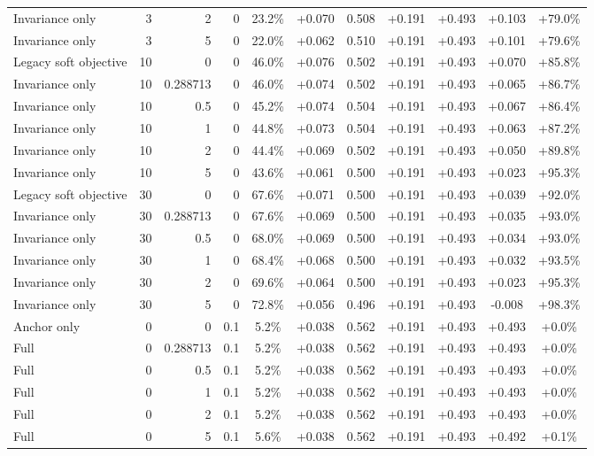 \begin{table}[htbp]
\begin{tabular}{lrrrccccccc}
Invariance only & 3 & 2 & 0 & 23.2\% & +0.070 & 0.508 & +0.191 & +0.493 & +0.103 & +79.0\% \\
Invariance only & 3 & 5 & 0 & 22.0\% & +0.062 & 0.510 & +0.191 & +0.493 & +0.101 & +79.6\% \\
Legacy soft objective & 10 & 0 & 0 & 46.0\% & +0.076 & 0.502 & +0.191 & +0.493 & +0.070 & +85.8\% \\
Invariance only & 10 & 0.288713 & 0 & 46.0\% & +0.074 & 0.502 & +0.191 & +0.493 & +0.065 & +86.7\% \\
Invariance only & 10 & 0.5 & 0 & 45.2\% & +0.074 & 0.504 & +0.191 & +0.493 & +0.067 & +86.4\% \\
Invariance only & 10 & 1 & 0 & 44.8\% & +0.073 & 0.504 & +0.191 & +0.493 & +0.063 & +87.2\% \\
Invariance only & 10 & 2 & 0 & 44.4\% & +0.069 & 0.502 & +0.191 & +0.493 & +0.050 & +89.8\% \\
Invariance only & 10 & 5 & 0 & 43.6\% & +0.061 & 0.500 & +0.191 & +0.493 & +0.023 & +95.3\% \\
Legacy soft objective & 30 & 0 & 0 & 67.6\% & +0.071 & 0.500 & +0.191 & +0.493 & +0.039 & +92.0\% \\
Invariance only & 30 & 0.288713 & 0 & 67.6\% & +0.069 & 0.500 & +0.191 & +0.493 & +0.035 & +93.0\% \\
Invariance only & 30 & 0.5 & 0 & 68.0\% & +0.069 & 0.500 & +0.191 & +0.493 & +0.034 & +93.0\% \\
Invariance only & 30 & 1 & 0 & 68.4\% & +0.068 & 0.500 & +0.191 & +0.493 & +0.032 & +93.5\% \\
Invariance only & 30 & 2 & 0 & 69.6\% & +0.064 & 0.500 & +0.191 & +0.493 & +0.023 & +95.3\% \\
Invariance only & 30 & 5 & 0 & 72.8\% & +0.056 & 0.496 & +0.191 & +0.493 & -0.008 & +98.3\% \\
Anchor only & 0 & 0 & 0.1 & 5.2\% & +0.038 & 0.562 & +0.191 & +0.493 & +0.493 & +0.0\% \\
Full & 0 & 0.288713 & 0.1 & 5.2\% & +0.038 & 0.562 & +0.191 & +0.493 & +0.493 & +0.0\% \\
Full & 0 & 0.5 & 0.1 & 5.2\% & +0.038 & 0.562 & +0.191 & +0.493 & +0.493 & +0.0\% \\
Full & 0 & 1 & 0.1 & 5.2\% & +0.038 & 0.562 & +0.191 & +0.493 & +0.493 & +0.0\% \\
Full & 0 & 2 & 0.1 & 5.2\% & +0.038 & 0.562 & +0.191 & +0.493 & +0.493 & +0.0\% \\
Full & 0 & 5 & 0.1 & 5.6\% & +0.038 & 0.562 & +0.191 & +0.493 & +0.492 & +0.1\% \\

\end{tabular}
\end{table}
